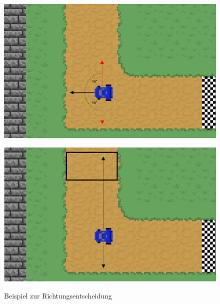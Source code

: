 \begin{figure}[h]
\centering
\begin{minipage}{0.45\textwidth}
\centering
	\includegraphics[scale=0.3]{pics/fahrtrichtung_vektor.png}
	\label{subfig:richtung_vektor}
\end{minipage}
\qquad
\begin{minipage}{0.45\textwidth}
\centering
	\includegraphics[scale=0.3]{pics/fahrtrichtung_entscheidung.png}
	\label{subfig:richtung_entscheidung}
\end{minipage}
\caption{Beispiel zur Richtungsentscheidung}
\label{fig:richtungsenscheidung}
\end{figure}

